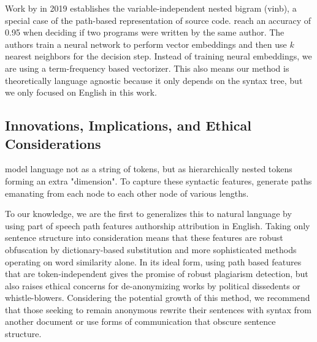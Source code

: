 \documentclass[11pt,a4paper]{article}
\begin{document}
Work by \citeauthor{9207647} in 2019 establishes the variable-independent nested bigram (vinb), a special case of the path-based representation of source code. \citeauthor{9207647} reach an accuracy of 0.95 when deciding if two programs were written by the same author. The authors train a neural network to perform vector embeddings and then use $k$ nearest neighbors for the decision step. Instead of training neural embeddings, we are using a term-frequency based vectorizer. This also means our method is theoretically language agnostic because it only depends on the syntax tree, but we only focused on English in this work.


\subsection{Innovations, Implications, and Ethical Considerations}

\citeauthor{2001.11593} model language not as a string of tokens, but as hierarchically nested tokens forming an extra "dimension". To capture these syntactic
features, \citeauthor{2001.11593} generate paths emanating from each node to each other node of various lengths.

To our knowledge, we are the first to generalizes this to natural language by using part of speech path features authorship attribution in English. Taking only sentence structure into consideration means that these features are robust obfuscation by dictionary-based substitution and more sophisticated methods operating on word similarity alone. In its ideal form, using path based features that are token-independent gives the promise of robust plagiarism detection, but also raises ethical concerns for de-anonymizing works by political dissedents or whistle-blowers. Considering the potential growth of this method, we recommend that those seeking to remain anonymous rewrite their sentences with syntax from another document or use forms of communication that obscure sentence structure.
\end{document}
